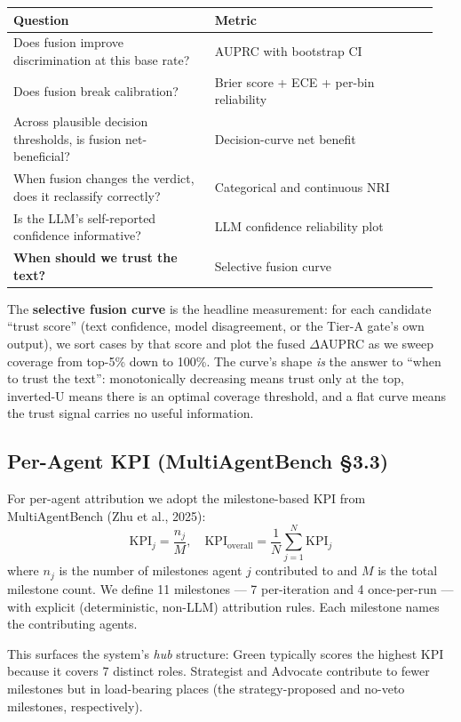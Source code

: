 \documentclass[11pt,a4paper]{article}
\begin{document}
\begin{center}
\begin{tabular}{@{}p{0.45\linewidth}p{0.50\linewidth}@{}}
\toprule
\textbf{Question} & \textbf{Metric} \\
\midrule
Does fusion improve discrimination at this base rate? & AUPRC with bootstrap CI \\
Does fusion break calibration? & Brier score + ECE + per-bin reliability \\
Across plausible decision thresholds, is fusion net-beneficial? & Decision-curve net benefit \\
When fusion changes the verdict, does it reclassify correctly? & Categorical and continuous NRI \\
Is the LLM's self-reported confidence informative? & LLM confidence reliability plot \\
\textbf{When should we trust the text?} & Selective fusion curve \\
\bottomrule
\end{tabular}
\end{center}

\noindent
The \textbf{selective fusion curve} is the headline measurement: for each
candidate ``trust score'' (text confidence, model disagreement, or the
Tier-A gate's own output), we sort cases by that score and plot the
fused $\Delta$AUPRC as we sweep coverage from top-5\% down to 100\%.
The curve's shape \emph{is} the answer to ``when to trust the text'':
monotonically decreasing means trust only at the top, inverted-U means
there is an optimal coverage threshold, and a flat curve means the
trust signal carries no useful information.

\subsection{Per-Agent KPI (MultiAgentBench \S3.3)}

For per-agent attribution we adopt the milestone-based KPI from
MultiAgentBench (Zhu et al., 2025):
\[
\mathrm{KPI}_j = \frac{n_j}{M}, \quad \mathrm{KPI}_{\mathrm{overall}} = \frac{1}{N}\sum_{j=1}^{N}\mathrm{KPI}_j
\]
where $n_j$ is the number of milestones agent $j$ contributed to and $M$
is the total milestone count. We define 11 milestones --- 7 per-iteration
and 4 once-per-run --- with explicit (deterministic, non-LLM) attribution
rules. Each milestone names the contributing agents.

\noindent
This surfaces the system's \emph{hub} structure: Green typically scores
the highest KPI because it covers 7 distinct roles. Strategist and
Advocate contribute to fewer milestones but in load-bearing places
(the strategy-proposed and no-veto milestones, respectively).
\end{document}
